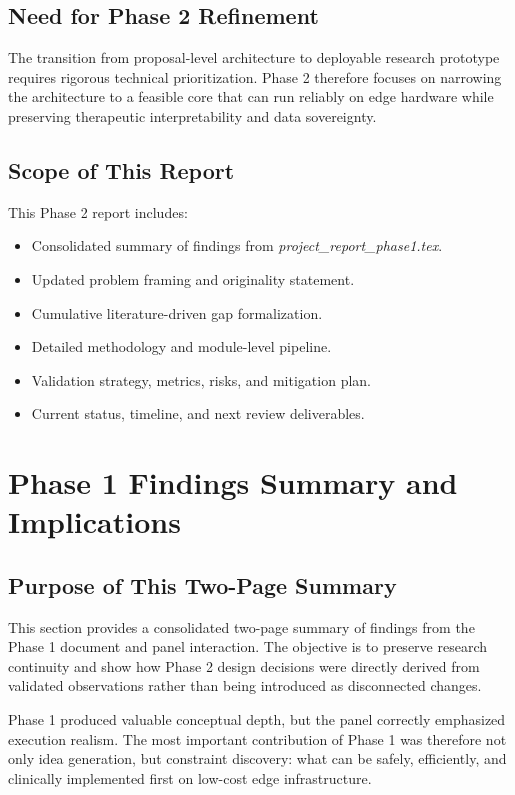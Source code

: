 \documentclass[12pt,a4paper]{article}
\begin{document}
\subsection{Need for Phase 2 Refinement}
The transition from proposal-level architecture to deployable research prototype requires rigorous technical prioritization. Phase 2 therefore focuses on narrowing the architecture to a feasible core that can run reliably on edge hardware while preserving therapeutic interpretability and data sovereignty.

\subsection{Scope of This Report}
This Phase 2 report includes:
\begin{itemize}[noitemsep,topsep=2pt]
\item Consolidated summary of findings from \textit{project\_report\_phase1.tex}.
\item Updated problem framing and originality statement.
\item Cumulative literature-driven gap formalization.
\item Detailed methodology and module-level pipeline.
\item Validation strategy, metrics, risks, and mitigation plan.
\item Current status, timeline, and next review deliverables.
\end{itemize}

\clearpage
\section{Phase 1 Findings Summary and Implications}
\subsection{Purpose of This Two-Page Summary}
This section provides a consolidated two-page summary of findings from the Phase 1 document and panel interaction. The objective is to preserve research continuity and show how Phase 2 design decisions were directly derived from validated observations rather than being introduced as disconnected changes.

Phase 1 produced valuable conceptual depth, but the panel correctly emphasized execution realism. The most important contribution of Phase 1 was therefore not only idea generation, but constraint discovery: what can be safely, efficiently, and clinically implemented first on low-cost edge infrastructure.
\end{document}
